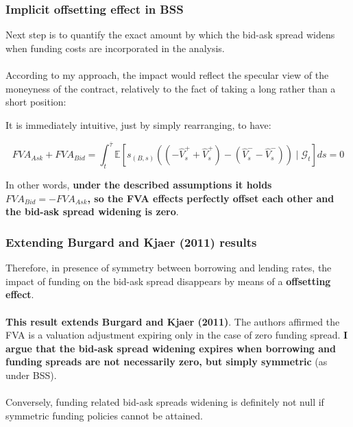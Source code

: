\documentclass{beamer}
\begin{document}
\begin{frame}
\frametitle{Implicit offsetting effect in BSS}
	Next step is to quantify the exact amount by which the bid-ask spread widens when funding costs are incorporated in the analysis. \\~\\
	According to my approach, the impact would reflect the specular view of the moneyness of the contract, relatively to the fact of taking a long rather than a short position:

	It is immediately intuitive, just by simply rearranging, to have:

	\footnotesize{
	\begin{equation}\label{bid-ask2}
		FVA_{Ask} + FVA_{Bid} = \int_{t}^{\bar{\tau} }  \mathbb{E} \left[    s_{(B,s)} \left(\left( -\hat{V}_{s}^{+} + \hat{V}_{s}^{+} \right)   - \left( \hat{V}_{s}^{-} - \hat{V}_{s}^{-} \right) \right) \mid \mathcal{G}_{t} \right] ds = 0
	\end{equation}}

	\bigskip

	In other words, \textbf{under the described assumptions it holds $FVA_{Bid} = - FVA_{Ask}$, so the FVA effects perfectly offset each other and the bid-ask spread widening is zero}. 
\end{frame}

\begin{frame}
\frametitle{Extending Burgard and Kjaer (2011) results}
	Therefore, in presence of symmetry between borrowing and lending rates, the impact of funding on the bid-ask spread disappears by means of a \textbf{offsetting effect}. \\~\\

	\textbf{This result extends Burgard and Kjaer (2011)}. The authors affirmed the FVA is a valuation adjustment expiring only in the case of zero funding spread. \textbf{I argue that the bid-ask spread widening expires when borrowing and funding spreads are not necessarily zero, but simply symmetric} (as under BSS). \\~\\ 

	Conversely, funding related bid-ask spreads widening is definitely not null if symmetric funding policies cannot be attained.
\end{frame}
\end{document}
